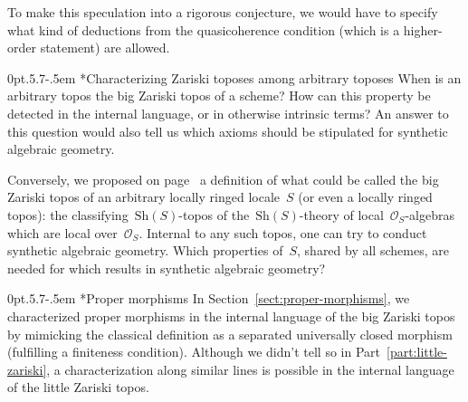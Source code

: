 \documentclass[10pt,reqno,a4paper]{amsbook}
\makeatletter
\theoremstyle{definition}
\theoremstyle{plain}
\theoremstyle{remark}
\renewcommand{\O}{\mathcal{O}}
\newcommand{\Sh}{\mathrm{Sh}}
\newcommand{\?}{\,{:}\,}
\renewcommand{\_}{\mathpunct{.}\,}
\newcommand{\speak}[1]{\ulcorner\text{\textnormal{#1}}\urcorner}
\def\subsection{\@startsection{subsection}{2}%
  {0pt}{.5\linespacing\@plus.7\linespacing}{-.5em}%
  {\normalfont\bfseries}}
\makeatother
\begin{document}
{To make this speculation into a rigorous conjecture, we would have to specify
what kind of deductions from the quasicoherence condition (which is a
higher-order statement) are allowed.

%


\subsection*{Characterizing Zariski toposes among arbitrary toposes}
When is an arbitrary topos the big Zariski topos of a scheme? How can this property
be detected in the internal language, or in otherwise intrinsic terms? An
answer to this question would also tell us which axioms should be stipulated
for synthetic algebraic geometry.

Conversely, we proposed on page~\pageref{page:big-zariski-of-lrl} a definition
of what could be called the big Zariski topos of an arbitrary locally ringed
locale~$S$ (or even a locally ringed topos): the classifying~$\Sh(S)$-topos of
the~$\Sh(S)$-theory of local~$\O_S$-algebras which are local over~$\O_S$.
Internal to any such topos, one can try to conduct synthetic algebraic
geometry. Which properties of~$S$, shared by all schemes, are needed for which
results in synthetic algebraic geometry?


\subsection*{Proper morphisms} In Section~\ref{sect:proper-morphisms}, we
characterized proper morphisms in the
internal language of the big Zariski topos by mimicking the classical
definition as a separated universally
closed morphism (fulfilling a finiteness condition). Although we didn't tell so
in Part~\ref{part:little-zariski}, a characterization along similar lines is
possible in the internal language of the little Zariski topos.

}
\end{document}
